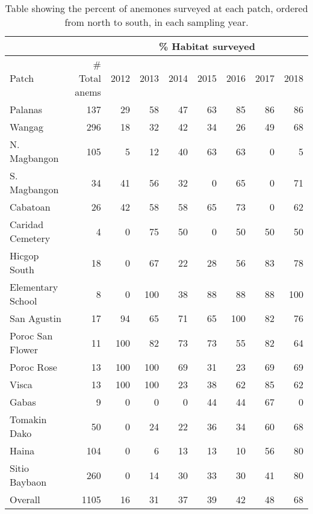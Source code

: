 \documentclass[12pt, oneside]{article}   	%
\begin{document}
\begin{table}[!htbp]
\caption{Table showing the percent of anemones surveyed at each patch, ordered from north to south, in each sampling year.} \label{APP_TAB_PercHabSampled}
\begin{centering}
\begin{tabular}{|l|r|r|r|r|r|r|r|r|}
\hline 
\multicolumn{2}{|c|}{} & \multicolumn{7}{|c|}{\% Habitat surveyed} \\ \hline
Patch & \# Total anems & 2012 & 2013 & 2014 & 2015 & 2016 & 2017 & 2018 \\ \hline
Palanas & 137 & 29 & 58 & 47 & 63 & 85 & 86 & 86 \\ \hline
Wangag & 296 & 18 & 32 & 42 & 34 & 26 & 49 & 68 \\ \hline
N. Magbangon & 105 & 5 & 12 & 40 & 63 & 63 & 0 & 5 \\ \hline
S. Magbangon & 34 & 41 & 56 & 32 & 0 & 65 & 0 & 71 \\ \hline
Cabatoan & 26 & 42 & 58 & 58 & 65 & 73 & 0 & 62 \\ \hline
Caridad Cemetery & 4 & 0 & 75 & 50 & 0 & 50 & 50 & 50 \\ \hline
Hicgop South & 18 & 0 & 67 & 22 & 28 & 56 & 83 & 78 \\ \hline
Elementary School & 8 & 0 & 100 & 38 & 88 & 88 & 88 & 100 \\ \hline
San Agustin & 17 & 94 & 65 & 71 & 65 & 100 & 82 & 76 \\ \hline
Poroc San Flower & 11 & 100 & 82 & 73 & 73 & 55 & 82 & 64 \\ \hline
Poroc Rose & 13 & 100 & 100 & 69 & 31 & 23 & 69 & 69 \\ \hline
Visca & 13 & 100 & 100 & 23 & 38 & 62 & 85 & 62 \\ \hline
Gabas & 9 & 0 & 0 & 0 & 44 & 44 & 67 & 0 \\ \hline
Tomakin Dako & 50 & 0 & 24 & 22 & 36 & 34 & 60 & 68 \\ \hline
Haina & 104 & 0 & 6 & 13 & 13 & 10 & 56 & 80 \\ \hline
Sitio Baybaon & 260 & 0 & 14 & 30 & 33 & 30 & 41 & 80 \\ \hline
Overall & 1105 & 16 & 31 & 37 & 39 & 42 & 48 & 68 \\ \hline
\end{tabular}
\end{centering}
\end{table}
\end{document}
